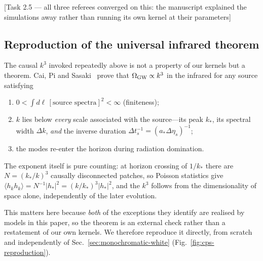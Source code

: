 \documentclass[10pt,prd,aps,nobibnotes,superscriptaddress,preprintnumbers,notitlepage]{revtex4-1}
\newcommand{\why}[1]{{\color{red}\footnotesize\textsf{[#1]}}}
\newcommand{\why}[1]{}
\begin{document}
\why{Task 2.5 --- all three referees converged on this: the manuscript explained the
simulations away rather than running its own kernel at their parameters}

\subsection{Reproduction of the universal infrared theorem}
\label{sec:cps-reproduction}

The causal $k^{3}$ invoked repeatedly above is not a property of our kernels but a
theorem. Cai, Pi and Sasaki~\cite{Cai:2019cdl} prove that
$\Omega_{\rm GW}\propto k^{3}$ in the infrared for any source satisfying
\begin{enumerate}\itemsep0pt
  \item[(I)] $0<\int d\ell\,[\text{source spectra}]^{2}<\infty$ (finiteness);
  \item[(II)] $k$ lies below \emph{every} scale associated with the source---its peak
    $k_{*}$, its spectral width $\Delta k$, \emph{and} the inverse duration
    $\Delta t_{s}^{-1}=(a_{*}\Delta\eta_{s})^{-1}$;
  \item[(III)] the modes re-enter the horizon during radiation domination.
\end{enumerate}
The exponent itself is pure counting: at horizon crossing of $1/k_{*}$ there are
$N=(k_{*}/k)^{3}$ causally disconnected patches, so Poisson statistics give
$\langle h_{k}h_{k}\rangle=N^{-1}|h_{*}|^{2}=(k/k_{*})^{3}|h_{*}|^{2}$, and the $k^{3}$
follows from the dimensionality of space alone, independently of the later evolution.

This matters here because \emph{both} of the exceptions they identify are realised by
models in this paper, so the theorem is an external check rather than a restatement of
our own kernels. We therefore reproduce it directly, from scratch and independently of
Sec.~\ref{sec:monochromatic-white} (Fig.~\ref{fig:cps-reproduction}).
\end{document}
